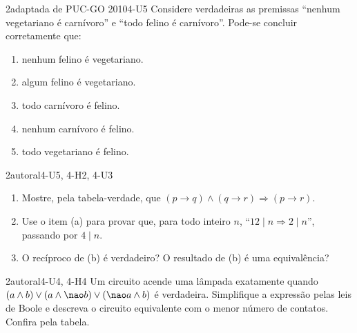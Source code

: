 \begin{questao}{2}{adaptada de PUC-GO 2010}{4-U5}\label{u4:q8}
Considere verdadeiras as premissas \enquote{nenhum vegetariano é carnívoro} e \enquote{todo felino é carnívoro}. Pode-se concluir corretamente que:
\begin{enumerate}[label=(\alph*)]
  \item nenhum felino é vegetariano.
  \item algum felino é vegetariano.
  \item todo carnívoro é felino.
  \item nenhum carnívoro é felino.
  \item todo vegetariano é felino.
\end{enumerate}
\end{questao}

\begin{questao}{2}{autoral}{4-U5, 4-H2, 4-U3}\label{u4:q9}
\begin{enumerate}[label=\alph*)]
  \item Mostre, pela tabela-verdade, que $(p\rightarrow q)\wedge(q\rightarrow r)\Rightarrow(p\rightarrow r)$.
  \item Use o item (a) para provar que, para todo inteiro $n$, \enquote{$12\mid n\Rightarrow 2\mid n$}, passando por $4\mid n$.
  \item O recíproco de (b) é verdadeiro? O resultado de (b) é uma equivalência?
\end{enumerate}
\end{questao}

\begin{questao}{2}{autoral}{4-U4, 4-H4}\label{u4:q10}
Um circuito acende uma lâmpada exatamente quando $(a\wedge b)\vee(a\wedge{\nao}b)\vee({\nao}a\wedge b)$ é verdadeira. Simplifique a expressão pelas leis de Boole e descreva o circuito equivalente com o menor número de contatos. Confira pela tabela.
\end{questao}

